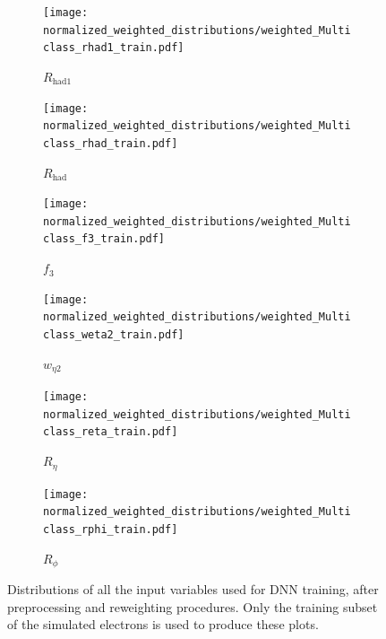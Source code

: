 \begin{figure}[htbp]
  \centering

  \begin{subfigure}[b]{0.47\textwidth}
    \centering
    \texttt{[image: normalized\_weighted\_distributions/weighted\_Multiclass\_rhad1\_train.pdf]}
    \caption{$R_{\text{had1}}$}
    \label{fig:input1}
  \end{subfigure}\hfill
  \begin{subfigure}[b]{0.47\textwidth}
    \centering
    \texttt{[image: normalized\_weighted\_distributions/weighted\_Multiclass\_rhad\_train.pdf]}
    \caption{$R_{\text{had}}$}
    \label{fig:input2}
  \end{subfigure}

  \vspace{0.45cm}

  \begin{subfigure}[b]{0.47\textwidth}
    \centering
    \texttt{[image: normalized\_weighted\_distributions/weighted\_Multiclass\_f3\_train.pdf]}
    \caption{$f_3$}
    \label{fig:input3}
  \end{subfigure}\hfill
  \begin{subfigure}[b]{0.47\textwidth}
    \centering
    \texttt{[image: normalized\_weighted\_distributions/weighted\_Multiclass\_weta2\_train.pdf]}
    \caption{$w_{\eta2}$}
    \label{fig:input4}
  \end{subfigure}

  \vspace{0.45cm}

  \begin{subfigure}[b]{0.47\textwidth}
    \centering
    \texttt{[image: normalized\_weighted\_distributions/weighted\_Multiclass\_reta\_train.pdf]}
    \caption{$R_{\eta}$}
    \label{fig:input5}
  \end{subfigure}\hfill
  \begin{subfigure}[b]{0.47\textwidth}
    \centering
    \texttt{[image: normalized\_weighted\_distributions/weighted\_Multiclass\_rphi\_train.pdf]}
    \caption{$R_{\phi}$}
    \label{fig:input6}
  \end{subfigure}

  \caption{Distributions of all the input variables used for DNN training, after preprocessing and reweighting procedures. Only the training subset of the simulated electrons is used to produce these plots.}
  \label{fig:dnn_inputs_distributions_A}
\end{figure}

